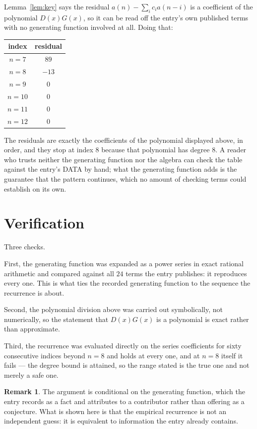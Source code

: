 \documentclass[11pt,a4paper]{article}
\theoremstyle{plain}
\theoremstyle{definition}
\newtheorem{remark}[theorem]{Remark}
\begin{document}
Lemma~\ref{lem:key} says the residual $a(n)-\sum_ic_ia(n-i)$ is a coefficient of the
polynomial $D(x)G(x)$, so it can be read off the entry's own published terms with no
generating function involved at all. Doing that:
\begin{center}
\begin{tabular}{cc}
index & residual \\ \hline
$n=7$ & $89$ \\
$n=8$ & $-13$ \\
$n=9$ & $0$ \\
$n=10$ & $0$ \\
$n=11$ & $0$ \\
$n=12$ & $0$
\end{tabular}
\end{center}
The residuals are exactly the coefficients of the polynomial displayed above, in order, and
they stop at index $8$ because that polynomial has degree $8$. A reader who trusts
neither the generating function nor the algebra can check the table against the entry's DATA
by hand; what the generating function adds is the guarantee that the pattern continues, which
no amount of checking terms could establish on its own.

\section{Verification}

Three checks.

First, the generating function was expanded as a power series in exact rational arithmetic and
compared against all $24$ terms the entry publishes: it reproduces every one. This is
what ties the recorded generating function to the sequence the recurrence is about.

Second, the polynomial division above was carried out symbolically, not numerically, so the
statement that $D(x)G(x)$ is a polynomial is exact rather than approximate.

Third, the recurrence was evaluated directly on the series coefficients for sixty consecutive
indices beyond $n=8$ and holds at every one, and at $n=8$ itself it fails --- the
degree bound is attained, so the range stated is the true one and not merely a safe one.

\begin{remark}
The argument is conditional on the generating function, which the entry records as a fact and
attributes to a contributor rather than offering as a conjecture. What is shown here is that
the empirical recurrence is not an independent guess: it is equivalent to information the
entry already contains.
\end{remark}
\end{document}
